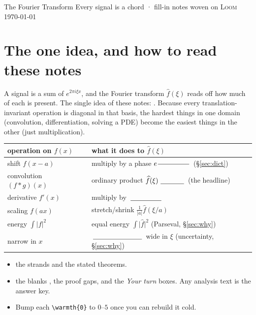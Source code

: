 \documentclass{loom}
\newcommand{\abs}[1]{\lvert #1\rvert}
\begin{document}
\loomcover
  {The Fourier Transform}
  {Every signal is a chord · fill-in notes}
  {woven on \textsc{Loom}}
  {\today}

\section*{The one idea, and how to read these notes}

\begin{strand}
A signal is a sum of  $e^{2\pi i\xi x}$, and the Fourier transform
$\widehat f(\xi)$ reads off how much of each is present. The single idea of these notes:
. Because every translation-invariant
operation is diagonal in that basis, the hardest things in one domain (convolution,
differentiation, solving a PDE) become the easiest things in the other (just multiplication).
\end{strand}

\noindent\begin{tabularx}{\linewidth}{@{}L L@{}}
\toprule
{\color{indigo}operation on $f(x)$} & {\color{madder}what it does to $\widehat f(\xi)$}\\
\midrule
shift $f(x-a)$                & multiply by a phase $e^{\fillin[1.6cm]}$ \;(§\ref{sec:dict})\\
convolution $(f*g)(x)$        & ordinary product $\widehat f(\xi)\,\fillin[1.2cm]$ \;(the headline)\\
derivative $f'(x)$            & multiply by $\fillin[1.6cm]$\\
scaling $f(ax)$              & stretch/shrink $\tfrac{1}{\abs a}\widehat f(\xi/a)$\\
energy $\int\abs{f}^2$        & equal energy $\int\abs{\widehat f}^2$ \;(Parseval, §\ref{sec:why})\\
narrow in $x$               & $\fillin[2.5cm]$ wide in $\xi$ \;(uncertainty, §\ref{sec:why})\\
\bottomrule
\end{tabularx}

\begin{itemize}[leftmargin=1.3em,itemsep=1pt]
  \item {} the strands and the stated theorems.
  \item {} the blanks \fillin[1.2cm], the  proof gaps, and the
        \emph{Your turn} boxes. Any analysis text is the answer key.
  \item Bump each \texttt{\textbackslash warmth\{0\}} to $0$--$5$ once you can rebuild it cold.
\end{itemize}

\clearpage
{\small\tableofcontents}

\clearpage




\end{document}
